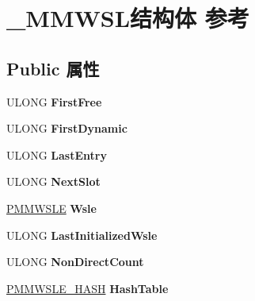 \hypertarget{struct___m_m_w_s_l}{}\section{\+\_\+\+M\+M\+W\+S\+L结构体 参考}
\label{struct___m_m_w_s_l}
\subsection*{Public 属性}
\begin{DoxyCompactItemize}
\item 
\mbox{\label{struct___m_m_w_s_l_af1aee2627c57ca05c47b04a49acdefce}} 
U\+L\+O\+NG {\bfseries First\+Free}
\item 
\mbox{\label{struct___m_m_w_s_l_afeff0dfb76f12fc9a74a8c028bebd8a3}} 
U\+L\+O\+NG {\bfseries First\+Dynamic}
\item 
\mbox{\label{struct___m_m_w_s_l_a3cce51a6aa3f7c2028217958cab3f6bc}} 
U\+L\+O\+NG {\bfseries Last\+Entry}
\item 
\mbox{\label{struct___m_m_w_s_l_ac72077416f4480b959ad0be125d3acb3}} 
U\+L\+O\+NG {\bfseries Next\+Slot}
\item 
\mbox{\label{struct___m_m_w_s_l_a7200f5af72bef027a24c5c505a4e26d2}} 
\hyperlink{struct___m_m_w_s_l_e}{P\+M\+M\+W\+S\+LE} {\bfseries Wsle}
\item 
\mbox{\label{struct___m_m_w_s_l_a5265f7e32029cba8dd8d2466bb3c21df}} 
U\+L\+O\+NG {\bfseries Last\+Initialized\+Wsle}
\item 
\mbox{\label{struct___m_m_w_s_l_a4dcada995820645529b589ce646295f9}} 
U\+L\+O\+NG {\bfseries Non\+Direct\+Count}
\item 
\mbox{\label{struct___m_m_w_s_l_a08d2fea7e5cbf980149308e092f9f76f}} 
\hyperlink{struct___m_m_w_s_l_e___h_a_s_h}{P\+M\+M\+W\+S\+L\+E\+\_\+\+H\+A\+SH} {\bfseries Hash\+Table}
\item 
\mbox{\label{struct___m_m_w_s_l_ad35956a2707df4215e5acc0f20fd73e2}} 

\end{DoxyCompactItemize}
